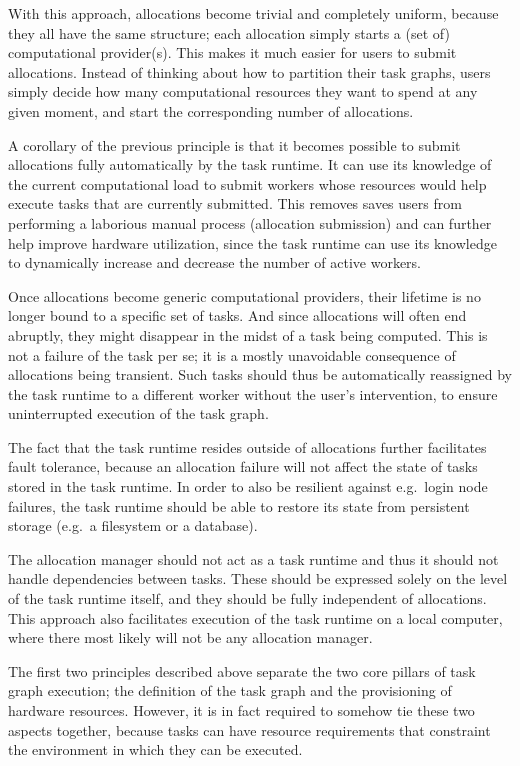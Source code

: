 \begin{description}[wide=0pt]
		With this approach, allocations become trivial and completely uniform, because they all have the
		same structure; each allocation simply starts a (set of) computational provider(s). This makes it
		much easier for users to submit allocations. Instead of thinking about how to partition their task
		graphs, users simply decide how many computational resources they want to spend at any given
		moment, and start the corresponding number of allocations.
	\item[Allocations are submitted automatically] A corollary of the previous principle is that it becomes possible to submit allocations fully
		automatically by the task runtime. It can use its knowledge of the current computational load to
		submit workers whose resources would help execute tasks that are currently submitted. This removes
		saves users from performing a laborious manual process (allocation submission) and can further help
		improve hardware utilization, since the task runtime can use its knowledge to dynamically increase
		and decrease the number of active workers.
	\item[Failed tasks are retried automatically] Once allocations become generic computational providers, their lifetime is no longer bound to a
		specific set of tasks. And since allocations will often end abruptly, they might disappear in the
		midst of a task being computed. This is not a failure of the task per se; it is a mostly
		unavoidable consequence of allocations being transient. Such tasks should thus be automatically
		reassigned by the task runtime to a different worker without the user's intervention, to ensure
		uninterrupted execution of the task graph.

		The fact that the task runtime resides outside of allocations further facilitates fault tolerance,
		because an allocation failure will not affect the state of tasks stored in the task runtime. In
		order to also be resilient against e.g.\ login node failures, the task runtime should be able to
		restore its state from persistent storage (e.g.\ a filesystem or a database).
	\item[Dependencies are independent of allocations] The allocation manager should not act as a task runtime and thus it should not handle dependencies
		between tasks. These should be expressed solely on the level of the task runtime itself, and they
		should be fully independent of allocations. This approach also facilitates execution of the task
		runtime on a local computer, where there most likely will not be any allocation manager.
	\item[Tasks are paired with workers using abstract resources] The first two principles described above separate the two core pillars of task graph execution; the
		definition of the task graph and the provisioning of hardware resources. However, it is in fact
		required to somehow tie these two aspects together, because tasks can have resource requirements
		that constraint the environment in which they can be executed.


\end{description}
